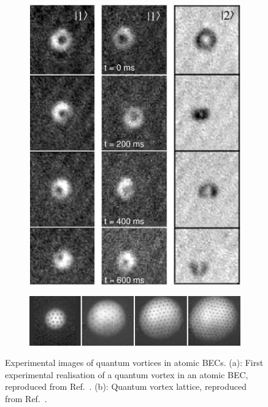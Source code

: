 \begin{figure}
    \centering
    \begin{subfigure}{0.49\textwidth}
        \includegraphics[width=\textwidth]
        {gfx/ch-introduction/first_quantum_vortex.png}
        \caption{\label{subfig: first-vortex}}
    \end{subfigure}
    \begin{subfigure}{0.49\textwidth}
        \centering
        \includegraphics[width=1.32\textwidth, height=0.5\textwidth, angle=-90]
        {gfx/ch-introduction/vortex_lattice.jpeg}
        \caption{\label{subfig: vortex-lattice}}
    \end{subfigure}
    \caption[Experimental images of quantum vortices in atomic BECs]
    {Experimental images of quantum vortices in atomic BECs.
        (a): First experimental realisation of a quantum vortex in an atomic BEC,
        reproduced from Ref.~\cite{Matthews1999}.
        (b): Quantum vortex lattice, reproduced from Ref.~\cite{Abo-Shaeer2001}.
    }
\end{figure}
